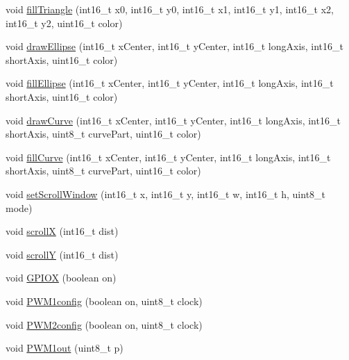 \begin{DoxyCompactItemize}
\item 
void \mbox{\hyperlink{class_adafruit___r_a8875_aaa22db3f01ad6fd1d0e4c26a35ece7d9}{fill\+Triangle}} (int16\+\_\+t x0, int16\+\_\+t y0, int16\+\_\+t x1, int16\+\_\+t y1, int16\+\_\+t x2, int16\+\_\+t y2, uint16\+\_\+t color)
\item 
void \mbox{\hyperlink{class_adafruit___r_a8875_af6646ba038ee45b44815ae1bd3eefe5e}{draw\+Ellipse}} (int16\+\_\+t x\+Center, int16\+\_\+t y\+Center, int16\+\_\+t long\+Axis, int16\+\_\+t short\+Axis, uint16\+\_\+t color)
\item 
void \mbox{\hyperlink{class_adafruit___r_a8875_a6e9b4ed00815402df1a2102f03098ecc}{fill\+Ellipse}} (int16\+\_\+t x\+Center, int16\+\_\+t y\+Center, int16\+\_\+t long\+Axis, int16\+\_\+t short\+Axis, uint16\+\_\+t color)
\item 
void \mbox{\hyperlink{class_adafruit___r_a8875_ab5583ae7924948ca6fc53abc28751502}{draw\+Curve}} (int16\+\_\+t x\+Center, int16\+\_\+t y\+Center, int16\+\_\+t long\+Axis, int16\+\_\+t short\+Axis, uint8\+\_\+t curve\+Part, uint16\+\_\+t color)
\item 
void \mbox{\hyperlink{class_adafruit___r_a8875_a37e83a3d738fbb9c7109b2242b3ebee1}{fill\+Curve}} (int16\+\_\+t x\+Center, int16\+\_\+t y\+Center, int16\+\_\+t long\+Axis, int16\+\_\+t short\+Axis, uint8\+\_\+t curve\+Part, uint16\+\_\+t color)
\item 
void \mbox{\hyperlink{class_adafruit___r_a8875_a6a07a16e5b32d1c0feec94b34290e6b1}{set\+Scroll\+Window}} (int16\+\_\+t x, int16\+\_\+t y, int16\+\_\+t w, int16\+\_\+t h, uint8\+\_\+t mode)
\item 
void \mbox{\hyperlink{class_adafruit___r_a8875_af4d86322451340de27f59de67ae3a145}{scrollX}} (int16\+\_\+t dist)
\item 
void \mbox{\hyperlink{class_adafruit___r_a8875_ab5c46f0b877fadea657548e2f7755a03}{scrollY}} (int16\+\_\+t dist)
\item 
void \mbox{\hyperlink{class_adafruit___r_a8875_a01818bca3c07064255d7d1dda0feac10}{G\+P\+I\+OX}} (boolean on)
\item 
void \mbox{\hyperlink{class_adafruit___r_a8875_ae5ec83867df1220ae6247fc614e3b61f}{P\+W\+M1config}} (boolean on, uint8\+\_\+t clock)
\item 
void \mbox{\hyperlink{class_adafruit___r_a8875_a49df93bf32be7e85fbb0370ce9fe2f95}{P\+W\+M2config}} (boolean on, uint8\+\_\+t clock)
\item 
void \mbox{\hyperlink{class_adafruit___r_a8875_aa9aff213337d70839995d50e6a88ba5c}{P\+W\+M1out}} (uint8\+\_\+t p)

\end{DoxyCompactItemize}
